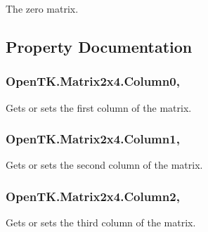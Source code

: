 The zero matrix. 



\subsection{Property Documentation}
\hypertarget{struct_open_t_k_1_1_matrix2x4_ab77adf403f71fb292be4ed6810552215}{
\subsubsection[{Column0}]{ Open\-T\-K.\-Matrix2x4.\-Column0\hspace{0.3cm}{\ttfamily [get]}, {\ttfamily [set]}}}\label{struct_open_t_k_1_1_matrix2x4_ab77adf403f71fb292be4ed6810552215}


Gets or sets the first column of the matrix. 

\hypertarget{struct_open_t_k_1_1_matrix2x4_a6e288af5ec95efa4a099da3ea0e73404}{
\subsubsection[{Column1}]{ Open\-T\-K.\-Matrix2x4.\-Column1\hspace{0.3cm}{\ttfamily [get]}, {\ttfamily [set]}}}\label{struct_open_t_k_1_1_matrix2x4_a6e288af5ec95efa4a099da3ea0e73404}


Gets or sets the second column of the matrix. 

\hypertarget{struct_open_t_k_1_1_matrix2x4_a72eb4174af9d4ac40160c7eecfd03023}{
\subsubsection[{Column2}]{ Open\-T\-K.\-Matrix2x4.\-Column2\hspace{0.3cm}{\ttfamily [get]}, {\ttfamily [set]}}}\label{struct_open_t_k_1_1_matrix2x4_a72eb4174af9d4ac40160c7eecfd03023}


Gets or sets the third column of the matrix. 

